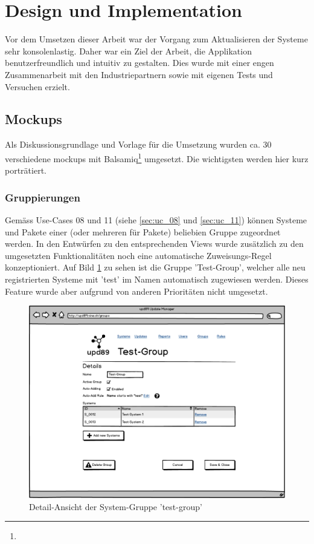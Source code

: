 \section{Design und Implementation}

Vor dem Umsetzen dieser Arbeit war der Vorgang zum Aktualisieren der Systeme sehr konsolenlastig. Daher war ein Ziel der Arbeit, die Applikation benutzerfreundlich und intuitiv zu gestalten. Dies wurde mit einer engen Zusammenarbeit mit den Industriepartnern sowie mit eigenen Tests und Versuchen erzielt.

\xxx

\subsection*{Mockups} \label{design:mockups}

Als Diskussionsgrundlage und Vorlage für die Umsetzung wurden ca. 30 verschiedene \glspl{mockup} mit Balsamiq\footnote{} umgesetzt. Die wichtigsten werden hier kurz porträtiert.

\subsubsection*{Gruppierungen}

Gemäss Use-Cases 08 und 11 (siehe \ref{sec:uc_08} und \ref{sec:uc_11}) können Systeme und Pakete einer (oder mehreren für Pakete) beliebien Gruppe zugeordnet werden. In den Entwürfen zu den entsprechenden Views wurde zusätzlich zu den umgesetzten Funktionalitäten noch eine automatische Zuweisungs-Regel konzeptioniert. Auf Bild \ref{fig:design:group_systems_mockup} zu sehen ist die Gruppe 'Test-Group', welcher alle neu registrierten Systeme mit 'test' im Namen automatisch zugewiesen werden. Dieses Feature wurde aber aufgrund von anderen Prioritäten nicht umgesetzt.

\begin{figure}[H]
	\centering
	\includegraphics[width=\linewidth]{files/mockups/group_systems}
	\caption{Detail-Ansicht der System-Gruppe 'test-group'}
	\label{fig:design:group_systems_mockup}
\end{figure}

